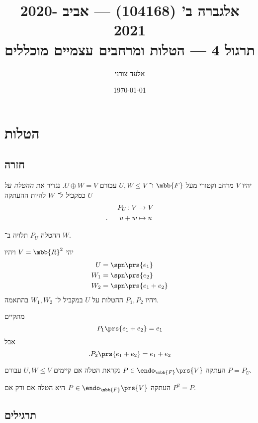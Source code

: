 \documentclass[a4paper,10pt,oneside,openany]{article}
\title{
אלגברה ב' (104168) \textenglish{---} אביב 2020-2021
\\
תרגול 4 \textenglish{---} הטלות ומרחבים עצמיים מוכללים
}
\author{אלעד צורני}
\date{\today}
\begin{document}
\maketitle

\section{הטלות}

\subsection{חזרה}

\begin{definition}
יהיו
$V$
מרחב וקטורי מעל
$\mbb{F}$
ו־%
$U,W \leq V$
עבורם
$U \oplus W = V$.
נגדיר את
\emph{ההטלה על
$U$
במקביל ל־%
$W$}
להיות ההעתקה
\begin{align*}
P_U \colon V &\to V \\
\text{.} \hphantom{lala} u+w &\mapsto u
\end{align*}
\end{definition}

\begin{remark}
ההטלה
$P_U$
תלויה ב־%
$W$.
\end{remark}

\begin{example}
יהי
$V = \mbb{R}^2$
ויהיו
\begin{align*}
U &= \spn\prs{e_1} \\
W_1 &= \spn\prs{e_2} \\
W_2 &= \spn\prs{e_1 + e_2}
\end{align*}
ויהיו
$P_1, P_2$
ההטלות על
$U$
במקביל ל־%
$W_1, W_2$
בהתאמה.

מתקיים
\[P_1 \prs{e_1 + e_2} = e_1\]
אבל
\[\text{.} P_2 \prs{e_1 + e_2} = e_1 + e_2\]
\end{example}

\begin{definition}[הטלה]
העתקה
$P \in \endo_{\mbb{F}}\prs{V}$
נקראת הטלה אם קיימים
$U,W \leq V$
עבורם
$P = P_U$.
\end{definition}

\begin{fact}
העתקה
$P \in \endo_{\mbb{F}}\prs{V}$
היא הטלה אם ורק אם
$P^2 = P$.
\end{fact}

\subsection{תרגילים}
\end{document}
